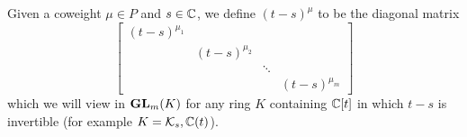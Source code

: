 \documentclass[draft]{article}
\begin{document}
% 



Given a coweight $\mu \in P$ and $ s\in \mathbb C$, we define $ (t-s)^\mu$ to be the diagonal matrix 
\[
\begin{bmatrix}
    (t-s)^{\mu_1} \\
    & (t-s)^{\mu_2} \\ 
    & & \ddots \\
    & & & (t-s)^{\mu_m}
\end{bmatrix} 
\]
which we will view in ${\mathbf{GL}}_m(K) $ for any ring $ K $ containing $\mathbb C[t]$ in which $t-s$ is invertible (for example $ K = \mathcal K_s, \mathbb C(t)$). %

\end{document}
